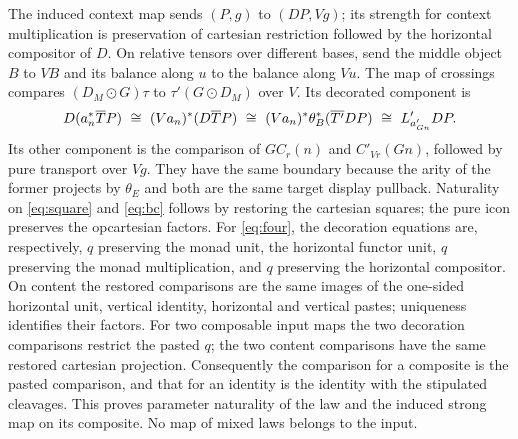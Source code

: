 \documentclass[11pt]{article}
\theoremstyle{definition}\newtheorem{definition}[theorem]{Definition}
\begin{document}
The induced context map sends $(P,g)$ to $(DP,Vg)$; its strength for
context multiplication is preservation of cartesian restriction followed
by the horizontal compositor of $D$. On relative tensors over different
bases, send the middle object $B$ to $VB$ and its balance along $u$
to the balance along $Vu$. The map of crossings compares
$(D_M\odot G)\tau$ to $\tau'(G\odot D_M)$ over $V$. Its decorated
component is
\[
 D(a_n^*\Tt P)\ \cong\ (V a_n)^*(D\Tt P)
 \ \cong\ (V a_n)^*\theta_B^*(\overline{T'}DP)
 \ \cong\ L'_{a'_{Gn}}DP .
\]
Its other component is the comparison of $G C_r(n)$ and $C'_{Vr}(Gn)$,
followed by pure transport over $Vg$. They have the same boundary
because the arity of the former projects by $\theta_E$ and both are the
same target display pullback. Naturality on \eqref{eq:square} and
\eqref{eq:bc} follows by restoring the cartesian squares; the pure
icon preserves the opcartesian factors. For \eqref{eq:four}, the
decoration equations are, respectively, $q$ preserving the monad
unit, the horizontal functor unit, $q$ preserving the monad
multiplication, and $q$ preserving the horizontal compositor.
On content the restored comparisons are the same images of the
one-sided horizontal unit, vertical identity, horizontal and vertical
pastes; uniqueness identifies their factors. For two composable input
maps the two decoration comparisons restrict the pasted $q$; the two
content comparisons have the same restored cartesian projection.
Consequently the comparison for a composite is the pasted comparison,
and that for an identity is the identity with the stipulated
cleavages. This proves parameter naturality of the law and the induced
strong map on its composite. No map of mixed laws belongs to the input.
\end{document}
